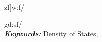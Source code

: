 \begin{center}
	{\preetiboldfont zf]w;f/
	}
\end{center}

{\preetifont gd:sf/
}\\

{\textit{\textbf{Keywords:}}
Density of States, 
}
